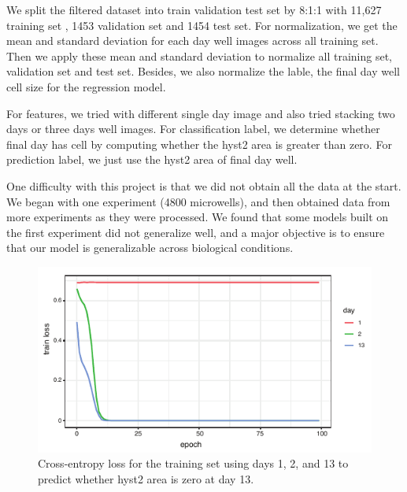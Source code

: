\documentclass[10pt,twocolumn,letterpaper]{article}
\begin{document}
We split the filtered dataset into train validation test set by 8:1:1 with 11,627 training set , 1453 validation set and 1454 test set. For normalization, we get the mean and standard deviation for each day well images across all training set. Then we apply these mean and standard deviation to normalize all training set, validation set and test set. Besides, we also normalize the lable, the final day well cell size for the regression model.

For features, we tried with different single day image and also tried stacking two days or three days well images. For classification label, we determine whether final day has cell by computing whether the hyst2 area is greater than zero. For prediction label, we just use the hyst2 area of final day well. 

One difficulty with this project is that we did not obtain all the data at the start.  We began with one experiment (4800 microwells), and then obtained data from more experiments as they were processed.   We found that some models built on the first experiment did not generalize well, and a major objective is to ensure that our model is generalizable across biological conditions.

 \begin{figure}[b!]
\begin{center}
 \includegraphics[width=0.9\linewidth]{figures/day13_train_loss_vs_epoch_vs_day_v2.pdf}
\end{center}
   \caption{Cross-entropy loss for the training set using days 1, 2, and 13 to predict whether hyst2 area is zero at day 13.}
\label{train_loss_day_1_2_13}
\end{figure}

\end{document}
